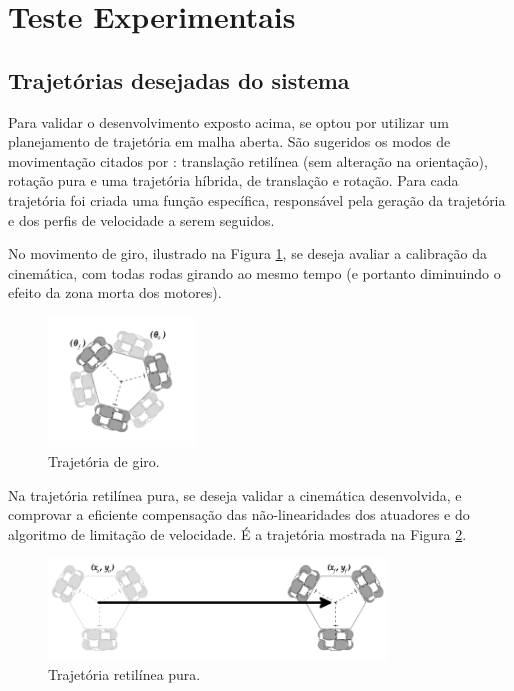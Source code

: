 
\section{Teste Experimentais}
\label{sec:experimental}
\subsection{Trajetórias desejadas do sistema}

Para validar o desenvolvimento exposto acima, se optou por utilizar um planejamento de trajetória em malha aberta. São sugeridos os modos de movimentação citados por \citet{loh2003mechatronics}: translação retilínea (sem alteração na orientação), rotação pura e uma trajetória híbrida, de translação e rotação. Para cada trajetória foi criada uma função específica, responsável pela geração da trajetória e dos perfis de velocidade a serem seguidos.

No movimento de giro, ilustrado na Figura \ref{fig:giro}, se deseja avaliar a calibração da cinemática, com todas rodas girando ao mesmo tempo (e portanto diminuindo o efeito da zona morta dos motores).

\begin{figure}[h]
  \centering
  \includegraphics[width = 0.35\textwidth]{imagens/giro}
  \caption{Trajetória de giro.}
  \label{fig:giro}
\end{figure}

Na trajetória retilínea pura, se deseja validar a cinemática desenvolvida, e comprovar a eficiente compensação das não-linearidades dos atuadores e do algoritmo de limitação de velocidade. É a trajetória mostrada na Figura \ref{fig:reta}.

\begin{figure}[h]
  \centering
  \includegraphics[width = 0.8\textwidth]{imagens/reta}
  \caption{Trajetória retilínea pura.}
  \label{fig:reta}
\end{figure}

